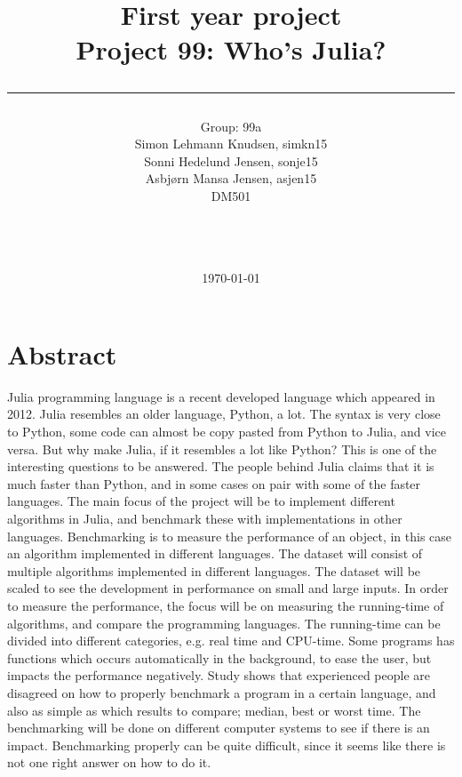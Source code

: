 \documentclass[a4paper,11pt]{article}
\title{First year project\\Project 99: Who's Julia?\\\rule{10cm}{0.5mm}}
\author{Group: 99a\\Simon Lehmann Knudsen, simkn15\\Sonni Hedelund Jensen, sonje15\\Asbjørn Mansa Jensen, asjen15
\\ DM501\\\rule{5.5cm}{0.5mm}\\}
\date{\today}
\begin{document}
\maketitle

\vfill

\newpage
\section*{Abstract}
Julia programming language is a recent developed language which appeared in 2012. Julia resembles an older language, Python, a lot. The syntax is very close to Python, some code can almost be copy pasted from Python to Julia, and vice versa. But why make Julia, if it resembles a lot like Python? This is one of the interesting questions to be answered. The people behind Julia claims that it is much faster than Python, and in some cases on pair with some of the faster languages. The main focus of the project will be to implement different algorithms in Julia, and benchmark these with implementations in other languages. Benchmarking is to measure the performance of an object, in this case an algorithm implemented in different languages. The dataset will consist of multiple algorithms implemented in different languages. The dataset will be scaled to see the development in performance on small and large inputs. In order to measure the performance, the focus will be on measuring the running-time of algorithms, and compare the programming languages. The running-time can be divided into different categories, e.g. real time and CPU-time. Some programs has functions which occurs automatically in the background, to ease the user, but impacts the performance negatively. Study shows that experienced people are disagreed on how to properly benchmark a program in a certain language, and also as simple as which results to compare; median, best or worst time. The benchmarking will be done on different computer systems to see if there is an impact. Benchmarking properly can be quite difficult, since it seems like there is not one right answer on how to do it.
\end{document}
